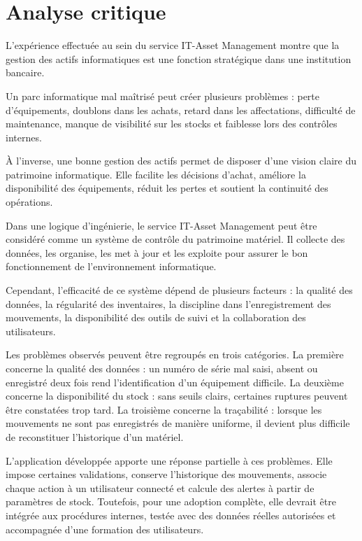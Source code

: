 \documentclass[12pt,a4paper]{report}
\begin{document}
\section{Analyse critique}

L'expérience effectuée au sein du service IT-Asset Management montre que la gestion des actifs informatiques est une fonction stratégique dans une institution bancaire.

Un parc informatique mal maîtrisé peut créer plusieurs problèmes : perte d'équipements, doublons dans les achats, retard dans les affectations, difficulté de maintenance, manque de visibilité sur les stocks et faiblesse lors des contrôles internes.

À l'inverse, une bonne gestion des actifs permet de disposer d'une vision claire du patrimoine informatique. Elle facilite les décisions d'achat, améliore la disponibilité des équipements, réduit les pertes et soutient la continuité des opérations.

Dans une logique d'ingénierie, le service IT-Asset Management peut être considéré comme un système de contrôle du patrimoine matériel. Il collecte des données, les organise, les met à jour et les exploite pour assurer le bon fonctionnement de l'environnement informatique.

Cependant, l'efficacité de ce système dépend de plusieurs facteurs : la qualité des données, la régularité des inventaires, la discipline dans l'enregistrement des mouvements, la disponibilité des outils de suivi et la collaboration des utilisateurs.

Les problèmes observés peuvent être regroupés en trois catégories. La première concerne la qualité des données : un numéro de série mal saisi, absent ou enregistré deux fois rend l'identification d'un équipement difficile. La deuxième concerne la disponibilité du stock : sans seuils clairs, certaines ruptures peuvent être constatées trop tard. La troisième concerne la traçabilité : lorsque les mouvements ne sont pas enregistrés de manière uniforme, il devient plus difficile de reconstituer l'historique d'un matériel.

L'application développée apporte une réponse partielle à ces problèmes. Elle impose certaines validations, conserve l'historique des mouvements, associe chaque action à un utilisateur connecté et calcule des alertes à partir de paramètres de stock. Toutefois, pour une adoption complète, elle devrait être intégrée aux procédures internes, testée avec des données réelles autorisées et accompagnée d'une formation des utilisateurs.
\end{document}
